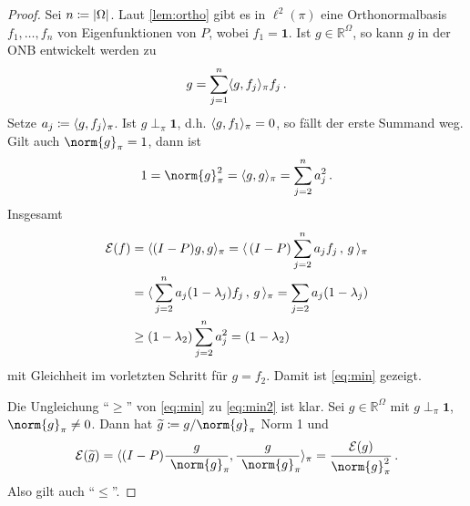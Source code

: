 \documentclass[ngerman,a4paper,11pt]{scrartcl}
\newcommand{\fracnorm}[3]{%
    \ensuremath{\frac{\! #1\!}{\! {}_{\phantom{#3}}\norm{#2}_{#3}\!}}%
}
\newcommand{\diri}{\mathcal{E}}
\newcommand{\RR}{\mathbb{R}}
\DeclarePairedDelimiter{\sprod}{\langle}{\rangle}	%
\DeclarePairedDelimiter{\abs}{\lvert}{\rvert}		%
\begin{document}


\begin{proof} %
 Sei $n\coloneqq\abs{\Omega}$. Laut \cref{lem:ortho} gibt es in $\ell^2(\pi)$ eine
 Orthonormalbasis $f_1,\dotsc,f_n$ von Eigenfunktionen von $P$, wobei $f_1=\mathbf{1}$. Ist
 $g\in\RR^\Omega$, so kann $g$ in der ONB entwickelt werden zu
 \begin{equation*}
  g=\sum_{j=1}^n\sprod{g,f_j}_\pi f_j\, . 
 \end{equation*}
 Setze $a_j\coloneqq\sprod{g,f_j}_\pi$.
 Ist $g\perp_\pi\mathbf{1}$, d.h. $\sprod{g,f_1}_\pi=0$, so fällt der erste
 Summand weg. Gilt auch $\norm{g}_\pi=1$, dann ist
 \begin{equation*}
  1=\norm{g}_\pi^2=\sprod{g,g}_\pi=\sum_{j=2}^na_j^2\, .
 \end{equation*}
 Insgesamt
 \begin{align*}
  \diri(f)&=\sprod{(I-P)g,g}_\pi=\sprod{\, (I-P)\sum_{j=2}^n a_j f_j\, ,\, g\,}_\pi \\
          &=\sprod{\, \sum_{j=2}^n a_j (1-\lambda_j)f_j\, ,\, g\, }_\pi=\sum_{j=2}a_j (1-\lambda_j) \\
          &\geq(1-\lambda_2)\sum_{j=2}^n a_j^2=(1-\lambda_2)
 \end{align*}
 mit Gleichheit im vorletzten Schritt für $g=f_2$. Damit ist \cref{eq:min} gezeigt.
 
 Die Ungleichung ``$\geq$'' von \eqref{eq:min} zu \eqref{eq:min2} ist klar. Sei
 $g\in\RR^\Omega$ mit $g\perp_\pi\mathbf{1}$, $\norm{g}_\pi\neq0$. Dann hat
 $\widetilde{g}\coloneqq g/\norm{g}_\pi$ Norm 1 und 
 \begin{equation*}
  \diri(\widetilde{g})=\sprod{(I-P)\fracnorm{g}{g}{\pi},\fracnorm{g}{g}{\pi}}_\pi=\frac{\diri(g)}{\norm{g}_\pi^2}\, .
 \end{equation*}
 Also gilt auch ``$\leq$''.
\end{proof}
\end{document}
